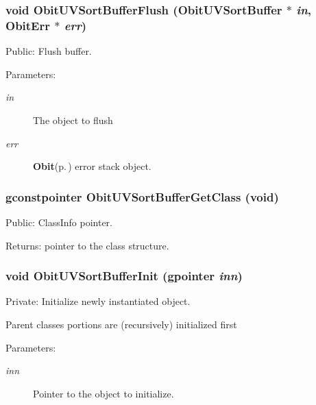 \subsubsection{\setlength{\rightskip}{0pt plus 5cm}void Obit\-UVSort\-Buffer\-Flush ({\bf Obit\-UVSort\-Buffer} $\ast$ {\em in}, {\bf Obit\-Err} $\ast$ {\em err})}\label{ObitUVSortBuffer_8c_a13}


Public: Flush buffer. 

\begin{Desc}
\item[Parameters:]
\begin{description}
\item[{\em in}]The object to flush \item[{\em err}]{\bf Obit}{\rm (p.\,\pageref{structObit})} error stack object. \end{description}
\end{Desc}
\subsubsection{\setlength{\rightskip}{0pt plus 5cm}gconstpointer Obit\-UVSort\-Buffer\-Get\-Class (void)}\label{ObitUVSortBuffer_8c_a8}


Public: Class\-Info pointer. 

\begin{Desc}
\item[Returns:]pointer to the class structure. \end{Desc}
\subsubsection{\setlength{\rightskip}{0pt plus 5cm}void Obit\-UVSort\-Buffer\-Init (gpointer {\em inn})}\label{ObitUVSortBuffer_8c_a3}


Private: Initialize newly instantiated object. 

Parent classes portions are (recursively) initialized first \begin{Desc}
\item[Parameters:]
\begin{description}
\item[{\em inn}]Pointer to the object to initialize. \end{description}
\end{Desc}
